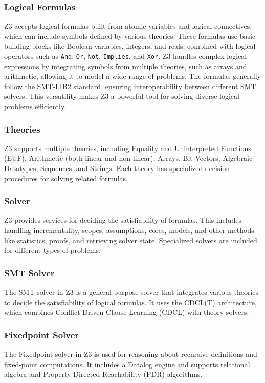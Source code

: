 \documentclass[]{rptuseminar}
\begin{document}
\subsubsection{Logical Formulas}
Z3 accepts logical formulas built from atomic variables and logical connectives, which can include symbols defined by various theories.
These formulas use basic building blocks like Boolean variables, integers, and reals, combined with logical operators such as
\texttt{And}, \texttt{Or}, \texttt{Not}, \texttt{Implies}, and \texttt{Xor}. Z3 handles complex logical expressions by
integrating symbols from multiple theories, such as arrays and arithmetic, allowing it to model a wide range of problems.
The formulas generally follow the SMT-LIB2 standard, ensuring interoperability between different SMT solvers. 
This versatility makes Z3 a powerful tool for solving diverse logical problems efficiently.
\cite{nikolaj_bjorner_programming_nodate}

\subsubsection{Theories}
Z3 supports multiple theories, including Equality and Uninterpreted Functions (EUF), Arithmetic (both linear and non-linear),
Arrays, Bit-Vectors, Algebraic Datatypes, Sequences, and Strings. Each theory has specialized decision procedures for solving
related formulas.
\cite{nikolaj_bjorner_programming_nodate}

\subsubsection{Solver}
Z3 provides services for deciding the satisfiability of formulas. This includes handling incrementality, scopes, assumptions, 
cores, models, and other methods like statistics, proofs, and retrieving solver state. Specialized solvers are included for 
different types of problems.
\cite{nikolaj_bjorner_programming_nodate}

\subsubsection*{SMT Solver}
The SMT solver in Z3 is a general-purpose solver that integrates various theories to decide the satisfiability of logical formulas. 
It uses the CDCL(T) architecture, which combines Conflict-Driven Clause Learning (CDCL) with theory solvers.
\cite{nikolaj_bjorner_programming_nodate}

\subsubsection*{Fixedpoint Solver}
The Fixedpoint solver in Z3 is used for reasoning about recursive definitions and fixed-point computations. 
It includes a Datalog engine and supports relational algebra and Property Directed Reachability (PDR) algorithms.
\cite{nikolaj_bjorner_programming_nodate} 
\end{document}
